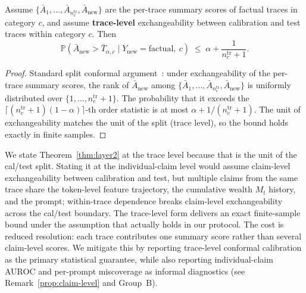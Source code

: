 \documentclass[runningheads]{llncs}
\begin{document}
\begin{theorem}
\label{thm:layer2}
Assume $\{\bar{A}_1, \ldots, \bar{A}_{n_c^{\text{tr}}}, \bar{A}_{\text{new}}\}$
are the per-trace summary scores of factual traces in category $c$, and assume
\textbf{trace-level} exchangeability between calibration and test traces
within category $c$. Then
\[
\mathbb{P}\!\left(\bar{A}_{\text{new}} > \bar{T}_{\alpha, c}
   \mid Y_{\text{new}} = \text{factual},\ c\right)
   \;\le\; \alpha + \frac{1}{n_c^{\text{tr}} + 1}.
\]
\end{theorem}

\begin{proof}
Standard split conformal argument~\cite{vovk2005algorithmic}: under
exchangeability of the per-trace summary scores, the rank of
$\bar{A}_{\text{new}}$ among
$\{\bar{A}_1, \ldots, \bar{A}_{n_c^{\text{tr}}}, \bar{A}_{\text{new}}\}$ is
uniformly distributed over $\{1, \ldots, n_c^{\text{tr}}+1\}$. The probability
that it exceeds the
$\lceil (n_c^{\text{tr}}+1)(1-\alpha) \rceil$-th order statistic is at most
$\alpha + 1/(n_c^{\text{tr}}+1)$. The unit of exchangeability matches the
unit of the split (trace level), so the bound holds exactly in finite samples.
\end{proof}

\begin{remark}
\label{rem:trace-unit-rationale}
We state Theorem~\ref{thm:layer2} at the trace level because that is the
unit of the cal/test split. Stating it at the individual-claim level
would assume claim-level exchangeability between calibration and test, but
multiple claims from the same trace share the token-level feature
trajectory, the cumulative wealth $M_t$ history, and the prompt; within-trace
dependence breaks claim-level exchangeability across the cal/test boundary.
The trace-level form delivers an exact finite-sample bound under the
assumption that actually holds in our protocol. The cost is reduced
resolution: each trace contributes one summary score rather than several
claim-level scores. We mitigate this by reporting trace-level conformal
calibration as the primary statistical guarantee, while also reporting
individual-claim AUROC and per-prompt miscoverage as informal
diagnostics (see Remark~\ref{prop:claim-level} and Group~B).
\end{remark}
\end{document}
